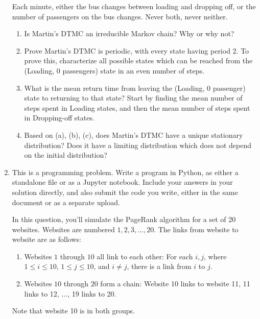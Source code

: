 \documentclass{article}
\begin{document}
\begin{enumerate}
    Each minute, either the bus changes between loading and dropping off, or the number of passengers on the bus changes. Never both, never neither.
    \begin{enumerate}
        \item Is Martin's DTMC an irreducible Markov chain? Why or why not?
        \item Prove Martin's DTMC is periodic, with every state having period 2. To prove this, characterize all possible states which can be reached from the (Loading, 0 passengers) state in an even number of steps.
        \item What is the mean return time from leaving the (Loading, 0 passenger) state to returning to that state?
        Start by finding the mean number of steps spent in Loading states, and then the mean number of steps spent in Dropping-off states.
        \item Based on (a), (b), (c), does Martin's DTMC have a unique stationary distribution? Does it have a limiting distribution which does not depend on the initial distribution?
    \end{enumerate}
    \item This is a programming problem. Write a program in Python, as either a standalone file or as a Jupyter notebook.
            Include your answers in your solution directly, and also submit the code you write, either in the same document or as a separate upload.

            In this question, you'll simulate the PageRank algorithm for
            a set of 20 websites. Websites are numbered $1, 2, 3, \ldots, 20$. The links from website to website are as follows:
            \begin{enumerate}
                \item Websites $1$ through $10$ all link to each other: For each $i, j$, where $1 \le i \le 10$, $1 \le j \le 10$, and $i \neq j$, there is a link from $i$ to $j$.
                \item Websites $10$ through $20$ form a chain:
                Website 10 links to website 11, 11 links to 12, $\ldots$, 19 links to 20.
            \end{enumerate}
            Note that website 10 is in both groups.


\end{enumerate}
\end{document}
